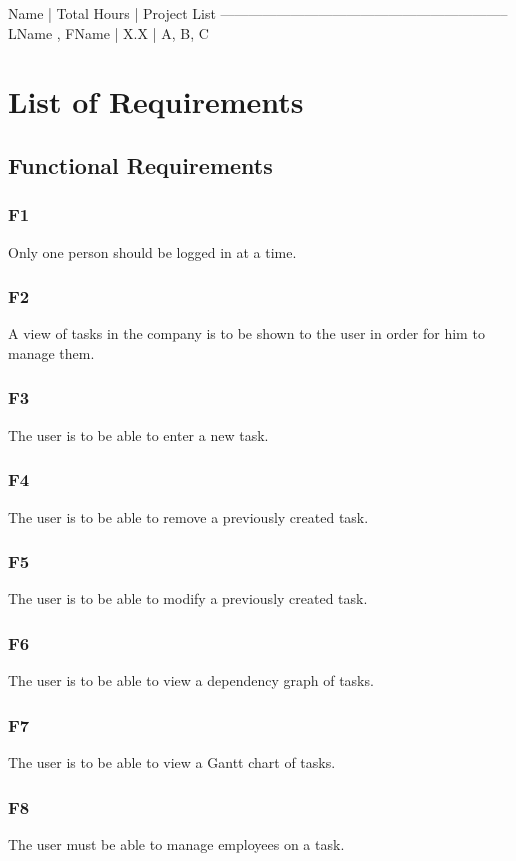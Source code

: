 \documentclass[12pt]{article}
\begin{document}
Name                    | Total Hours | Project List
--------------------------------------------------------------
LName , FName           |         X.X | A, B, C

\section{List of Requirements}

\subsection{Functional Requirements}
\subsubsection{F1}
{
 Only one person should be logged in at a time.
}
\subsubsection{F2}
{
A view of tasks in the company is to be shown to the user in order for him to manage them.
}
\subsubsection{F3}
{
The user is to be able to enter a new task.
}
\subsubsection{F4}
{
The user is to be able to remove a previously created task.
}
\subsubsection{F5}
{
The user is to be able to modify a previously created task.
}
\subsubsection{F6}
{
The user is to be able to view a dependency graph of tasks.
}
\subsubsection{F7}
{
The user is to be able to view a Gantt chart of tasks.
}
\subsubsection{F8}
{
The user must be able to manage employees on a task.
}
\end{document}

